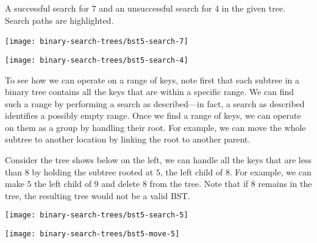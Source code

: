 \begin{chapter}
\begin{example}

A successful search for $7$ and an unsuccessful search for $4$ in the
given tree.  Search paths are highlighted.


\begin{center}
\parbox[t]{3cm}
{
\vspace*{0cm}
\texttt{[image: binary-search-trees/bst5-search-7]}\
}
%
\hspace*{3cm}
%
\parbox[t]{3cm}
{
\vspace*{0cm}
\texttt{[image: binary-search-trees/bst5-search-4]}
}
\end{center}
\end{example}

To see how we can operate on a range of keys, note first that each
subtree in a binary tree contains all the keys that are within a
specific range. 
%
We can find such a range by performing a search as
described---in fact, a search as described identifies a possibly empty
range. Once we find a range of keys, we can operate on them as a group
by handling their root.
%
For example, we can move the whole subtree to another location by
linking the root to another parent.

\begin{example}
Consider the tree shows below on the left, we can handle all the keys
that are less than $8$ by holding the subtree rooted at $5$, the left
child of $8$.  For example, we can make $5$ the left child of $9$ and
delete $8$ from the tree. Note that if $8$ remains in the tree, the
resulting tree would not be a valid BST.

\begin{center}
\parbox[t]{3cm}
{
\vspace*{0cm}
\texttt{[image: binary-search-trees/bst5-search-5]}
}
\hspace*{3cm}
\parbox[t]{3cm}
{
\vspace*{0cm}
\texttt{[image: binary-search-trees/bst5-move-5]}
}
\end{center}
\end{example}




\end{chapter}
